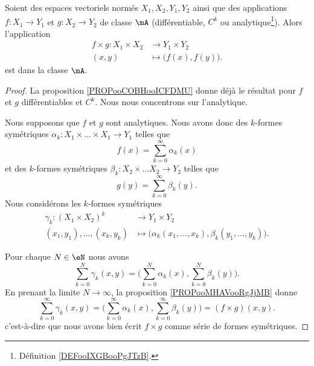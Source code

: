 \begin{proposition}	\label{PROPooPESTooQmWGRJ}
	Soient des espaces vectoriels normés \( X_1, X_2,Y_1,Y_2\) ainsi que des applications \(f \colon X_1\to Y_1  \) et \(g \colon X_2\to Y_2  \) de classe \( \mA\) (différentiable, \( C^k\) ou analytique\footnote{Définition \ref{DEFooIXGBooPgJTzB}.}). Alors l'application
	\begin{equation}
		\begin{aligned}
			f\times g\colon X_1\times X_2 & \to Y_1\times Y_2               \\
			(x,y)                         & \mapsto \big( f(x), f(y) \big).
		\end{aligned}
	\end{equation}
	est dans la classe \( \mA\).
\end{proposition}

\begin{proof}

	La proposition \ref{PROPooCOBHooICFDMU} donne déjà le résultat pour \( f\) et \( g\) différentiables et \( C^k\). Nous nous concentrons sur l'analytique.

	Nous supposons que \( f\) et \( g\) sont analytiques. Nous avons donc des \( k\)-formes symétriques \(\alpha_k \colon X_1\times\ldots\times X_1\to Y_1  \) telles que
	\begin{equation}
		f(x)=\sum_{k=0}^{\infty}\alpha_k(x)
	\end{equation}
	et des \( k\)-formes symétriques \(\beta_k \colon X_2\times \ldots X_2\to Y_2  \) telles que
	\begin{equation}
		g(y)=\sum_{k=0}^{\infty}\beta_k(y).
	\end{equation}
	Nous considérons les \( k\)-formes symétriques
	\begin{equation}
		\begin{aligned}
			\gamma_k\colon (X_1\times X_2)^k & \to Y_1\times Y_2                                                     \\
			(x_1,y_1),\ldots,(x_k,y_k)       & \mapsto \big( \alpha_k(x_1,\ldots,x_k),\beta_k(y_1,\ldots,y_k) \big).
		\end{aligned}
	\end{equation}

	Pour chaque \( N\in \eN\) nous avons
	\begin{equation}
		\sum_{k=0}^N\gamma_k(x,y)=\big( \sum_{k=0}^N\alpha_k(x),\sum_{k=0}^N\beta_k(y) \big).
	\end{equation}
	En prenant la limite \( N\to \infty\), la proposition \ref{PROPooMHAVooRgJjMB} donne
	\begin{equation}
		\sum_{k=0}^{\infty}\gamma_k(x,y)=\big( \sum_{k=0}^{\infty}\alpha_k(x),\sum_{k=0}^{\infty}\beta_k(y) \big)=(f\times g)(x,y).
	\end{equation}
	c'est-à-dire que nous avons bien écrit \( f\times g\) comme série de formes symétriques.
\end{proof}


